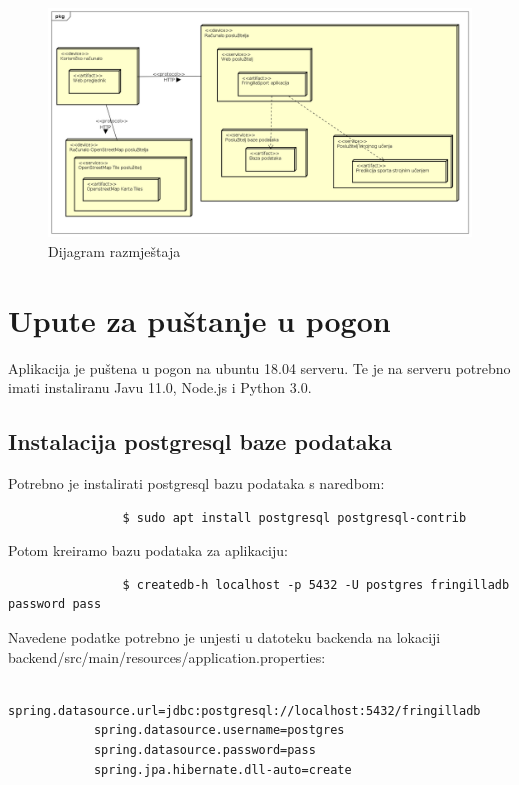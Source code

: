 			\begin{figure}[H]
				 \includegraphics[width=\textwidth]{dijagrami/DeploymentDiagram0.png}
				 \caption{Dijagram razmještaja}
			\end{figure}
			
			\eject 
		
		\section{Upute za puštanje u pogon}
		
			Aplikacija je puštena u pogon na ubuntu 18.04 serveru. Te je na serveru potrebno imati instaliranu Javu 11.0, Node.js i Python 3.0.
			
			\subsection{Instalacija postgresql baze podataka}
			Potrebno je instalirati postgresql bazu podataka s naredbom:
			\begin{verbatim}
				$ sudo apt install postgresql postgresql-contrib
			\end{verbatim}
			Potom kreiramo bazu podataka za aplikaciju:
			\begin{verbatim}
				$ createdb-h localhost -p 5432 -U postgres fringilladb password pass
			\end{verbatim}
			Navedene podatke potrebno je unjesti u datoteku backenda na lokaciji backend/src/main/resources/application.properties:
			
			\begin{verbatim}
			spring.datasource.url=jdbc:postgresql://localhost:5432/fringilladb
			spring.datasource.username=postgres
			spring.datasource.password=pass
			spring.jpa.hibernate.dll-auto=create
			\end{verbatim}
			
